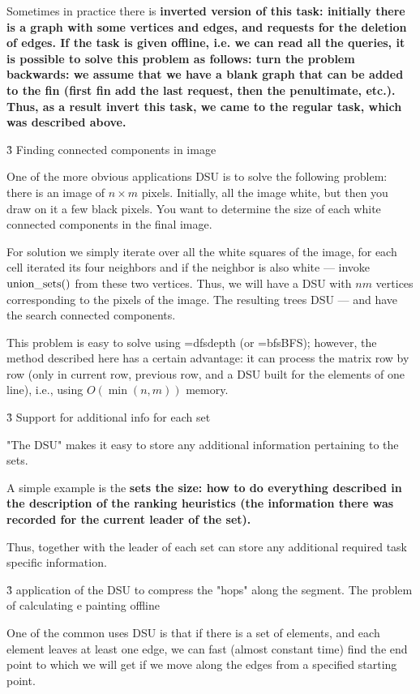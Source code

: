 Sometimes in practice there is \bf{inverted version of this task}: initially there is a graph with some vertices and edges, and requests for the deletion of edges. If the task is given offline, i.e. we can read all the queries, it is possible to solve this problem as follows: turn the problem backwards: we assume that we have a blank graph that can be added to the fin (first fin add the last request, then the penultimate, etc.). Thus, as a result invert this task, we came to the regular task, which was described above.



\h3{ Finding connected components in image }

One of the more obvious applications DSU is to solve the following problem: there is an image of $n \times m$ pixels. Initially, all the image white, but then you draw on it a few black pixels. You want to determine the size of each white connected components in the final image.

For solution we simply iterate over all the white squares of the image, for each cell iterated its four neighbors and if the neighbor is also white --- invoke ${\rm union\_sets}()$ from these two vertices. Thus, we will have a DSU with $nm$ vertices corresponding to the pixels of the image. The resulting trees DSU --- and have the search connected components.

This problem is easy to solve using \algohref=dfs{depth} (or \algohref=bfs{BFS}); however, the method described here has a certain advantage: it can process the matrix row by row (only in current row, previous row, and a DSU built for the elements of one line), i.e., using $O(\min (n, m))$ memory.



\h3{ Support for additional info for each set }

"The DSU" makes it easy to store any additional information pertaining to the sets.

A simple example is the \bf{sets the size}: how to do everything described in the description of the ranking heuristics (the information there was recorded for the current leader of the set).

Thus, together with the leader of each set can store any additional required task specific information.



\h3{ application of the DSU to compress the "hops" along the segment. The problem of calculating e painting offline }

One of the common uses DSU is that if there is a set of elements, and each element leaves at least one edge, we can fast (almost constant time) find the end point to which we will get if we move along the edges from a specified starting point.

